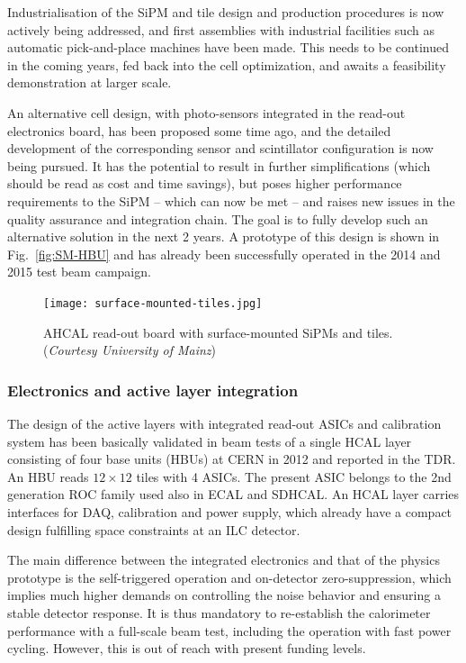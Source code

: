 Industrialisation of the SiPM and tile design and production procedures is now actively being addressed, and first assemblies with industrial facilities such as automatic pick-and-place machines have been made. This needs to be continued in the coming years, fed back into the cell optimization, and awaits a feasibility demonstration at larger scale.

An alternative cell design, with photo-sensors integrated in the read-out electronics board, has been proposed some time ago, and the detailed development of the corresponding sensor and scintillator configuration is now being pursued. It has the potential to result in further simplifications (which should be read as cost and time savings), but poses higher performance requirements to the SiPM -- which can now be met --  and raises new issues in the quality assurance and integration chain. The goal is to fully develop such an alternative solution in the next 2 years. A prototype of this design is shown in Fig.~\ref{fig:SM-HBU} and has already been successfully operated in the 2014 and 2015 test beam campaign.
%
\begin{figure}[htb]
\begin{center}
\texttt{[image: surface-mounted-tiles.jpg]}
\end{center}
\caption{\label{fig:SM/HBU} AHCAL read-out board with surface-mounted SiPMs and tiles. ({\it Courtesy University of Mainz})}
\end{figure}


\subsubsection{Electronics and active layer integration}

The design of the active layers with integrated read-out ASICs and calibration system has been basically validated in beam tests of a single HCAL layer consisting of four base units (HBUs) at CERN in 2012 and reported in the TDR. An HBU reads $12 \times 12$ tiles with 4 ASICs. The present ASIC belongs to the 2nd generation ROC family used also in ECAL and SDHCAL. An HCAL layer carries interfaces for DAQ, calibration and power supply, which already have a compact design fulfilling space constraints at an ILC detector.

The main difference between the integrated electronics and that of the physics prototype is the self-triggered operation and on-detector zero-suppression, which implies much higher demands on controlling the noise behavior and ensuring a stable detector response. It is thus mandatory to re-establish the calorimeter performance with a full-scale beam test, including the operation with fast power cycling. However, this is out of reach with present funding levels.

